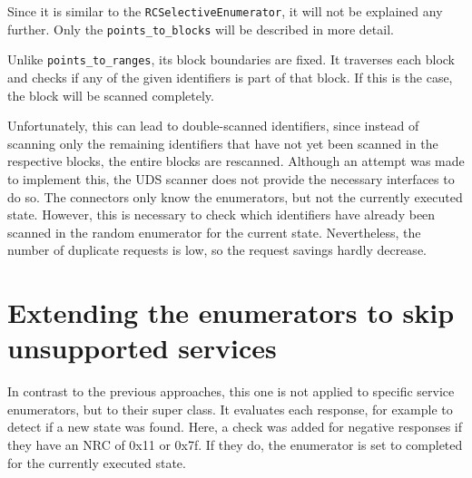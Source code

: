Since it is similar to the \texttt{RCSelectiveEnumerator}, it will not be explained any further. Only the \texttt{points_to_blocks} will be described in more detail.


Unlike \texttt{points_to_ranges}, its block boundaries are fixed. 
It traverses each block and checks if any of the given identifiers is part of that block. 
If this is the case, the block will be scanned completely.

Unfortunately, this can lead to double-scanned identifiers, since instead of scanning only the remaining identifiers that have not yet been scanned in the respective blocks, the entire blocks are rescanned. 
Although an attempt was made to implement this, the UDS scanner does not provide the necessary interfaces to do so. 
The connectors only know the enumerators, but not the currently executed state. 
However, this is necessary to check which identifiers have already been scanned in the random enumerator for the current state. 
Nevertheless, the number of duplicate requests is low, so the request savings hardly decrease.

\section{Extending the enumerators to skip unsupported services}

In contrast to the previous approaches, this one is not applied to specific service enumerators, but to their super class. 
It evaluates each response, for example to detect if a new state was found. 
Here, a check was added for negative responses if they have an NRC of 0x11 or 0x7f. 
If they do, the enumerator is set to completed for the currently executed state.

